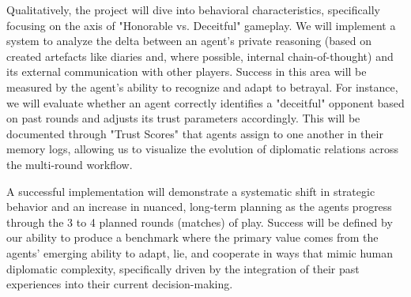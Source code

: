 \documentclass[a4paper,oneside,bibliography=totoc]{scrbook}
\begin{document}
Qualitatively, the project will dive into behavioral characteristics, specifically focusing on the axis of "Honorable vs. Deceitful" gameplay. We will implement a system to analyze the delta between an agent’s private reasoning (based on created artefacts like diaries and, where possible, internal chain-of-thought) and its external communication with other players.  Success in this area will be measured by the agent’s ability to recognize and adapt to betrayal. For instance, we will evaluate whether an agent correctly identifies a "deceitful" opponent based on past rounds and adjusts its trust parameters accordingly. This will be documented through "Trust Scores" that agents assign to one another in their memory logs, allowing us to visualize the evolution of diplomatic relations across the multi-round workflow.

A successful implementation will demonstrate a systematic shift in strategic behavior and an increase in nuanced, long-term planning as the agents progress through the 3 to 4 planned rounds (matches) of play. Success will be defined by our ability to produce a benchmark where the primary value comes from the agents' emerging ability to adapt, lie, and cooperate in ways that mimic human diplomatic complexity, specifically driven by the integration of their past experiences into their current decision-making.
\end{document}
